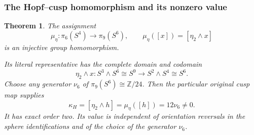 \documentclass[11pt]{article}
\newtheorem{theorem}{Theorem}[section]
\theoremstyle{definition}
\begin{document}
\subsubsection{The Hopf--cusp homomorphism and its nonzero value}

\begin{theorem}
\label{hbridge:mu-theorem}
The assignment
\begin{equation}
\mu_\eta:\pi_6(S^4)\longrightarrow\pi_9(S^6),\qquad
\mu_\eta([x])=[\eta_2\wedge x]
\label{hbridge:eq:mu}
\end{equation}
is an injective group homomorphism.\par
Its literal representative has
the complete domain and codomain
\[
\eta_2\wedge x:S^3\wedge S^6\cong S^9
\longrightarrow S^2\wedge S^4\cong S^6.
\]
Choose any generator \(\nu_6\) of
\(\pi_9(S^6)\cong\mathbb Z/24\). Then the particular original
cusp map supplies
\begin{equation}
\kappa_H=[\eta_2\wedge h]
=\mu_\eta([h])=12\nu_6\ne0.
\label{hbridge:eq:kappa}
\end{equation}
It has exact order two. Its value is independent of orientation
reversals in the sphere identifications and of the choice of the
generator \(\nu_6\).
\end{theorem}
\end{document}
